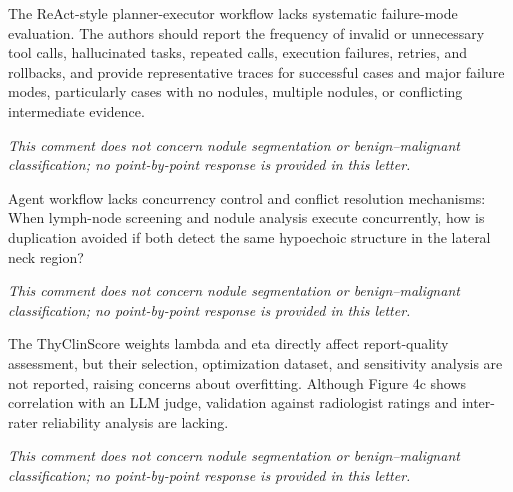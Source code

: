 \begin{reviewercomment}
The ReAct-style planner-executor workflow lacks systematic failure-mode evaluation. The authors should report the frequency of invalid or unnecessary tool calls, hallucinated tasks, repeated calls, execution failures, retries, and rollbacks, and provide representative traces for successful cases and major failure modes, particularly cases with no nodules, multiple nodules, or conflicting intermediate evidence.
\end{reviewercomment}
\begin{authorresponse}
\noindent\textit{This comment does not concern nodule segmentation or benign--malignant classification; no point-by-point response is provided in this letter.}
\end{authorresponse}

\begin{reviewercomment}
Agent workflow lacks concurrency control and conflict resolution mechanisms: When lymph-node screening and nodule analysis execute concurrently, how is duplication avoided if both detect the same hypoechoic structure in the lateral neck region?
\end{reviewercomment}
\begin{authorresponse}
\noindent\textit{This comment does not concern nodule segmentation or benign--malignant classification; no point-by-point response is provided in this letter.}
\end{authorresponse}

\begin{reviewercomment}
The ThyClinScore weights lambda and eta directly affect report-quality assessment, but their selection, optimization dataset, and sensitivity analysis are not reported, raising concerns about overfitting. Although Figure 4c shows correlation with an LLM judge, validation against radiologist ratings and inter-rater reliability analysis are lacking.
\end{reviewercomment}
\begin{authorresponse}
\noindent\textit{This comment does not concern nodule segmentation or benign--malignant classification; no point-by-point response is provided in this letter.}
\end{authorresponse}

